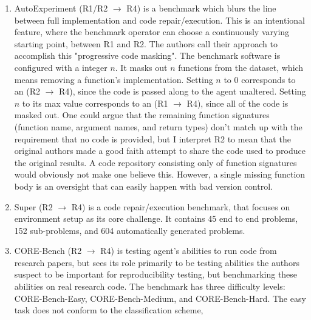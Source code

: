 \documentclass[8pt,a4paper]{article}
\begin{document}
\begin{enumerate}
         curated papers across diverse domains, including knowledge distillation and Partial differential equations.
        \subitem Evaluates whether the generated code accurately reflects the paper and code by the authors, using an LLM judge.
        \subitem Also evaluates whether the generated code reproduces the original result, using the original metric from the paper.
    \item AutoExperiment\cite{autoexperiment} (R1/R2 $\rightarrow$ R4)
        is a benchmark which blurs the line between full implementation and code repair/execution.
        This is an intentional feature, where the benchmark operator can choose a continuously varying starting point,
        between R1 and R2. The authors call their approach to accomplish this "progressive code masking".
        The benchmark software is configured with a integer $n$. It masks out $n$ functions from the dataset, 
        which means removing a function's implementation.
        Setting $n$ to 0 corresponds to an (R2 $\rightarrow$ R4), 
        since the code is passed along to the agent unaltered.
        Setting $n$ to its max value corresponds to an (R1 $\rightarrow$ R4), 
        since all of the code is masked out.
        One could argue that the remaining function signatures (function name, argument names, and return types)
        don't match up with the requirement that no code is provided, 
        but I interpret R2 to mean that the original authors made 
        a good faith attempt to share the code used to produce the original results.
        A code repository consisting only of function signatures would obviously not make one believe this.
        However, a single missing function body is an oversight that can easily happen with bad version control.
    \item Super\cite{super} (R2 $\rightarrow$ R4)
        \subitem is a code repair/execution benchmark, that focuses on environment setup as its core challenge.
        It contains 45 end to end problems, 152 sub-problems, and 604 automatically generated problems.
    \item CORE-Bench\cite{corebench} (R2 $\rightarrow$ R4)
        \subitem is testing agent's abilities to run code from research papers, 
        but sees its role primarily to be testing abilities the authors suspect to be important for reproducibility testing,
        but benchmarking these abilities on real research code.
        The benchmark has three difficulty levels:
        CORE-Bench-Easy, CORE-Bench-Medium, and CORE-Bench-Hard.
        The easy task does not conform to the classification scheme, 

\end{enumerate}
\end{document}
